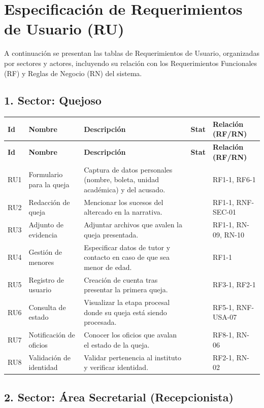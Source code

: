 \documentclass{article}
\begin{document}
\section*{Especificación de Requerimientos de Usuario (RU)}

A continuación se presentan las tablas de Requerimientos de Usuario, organizadas por sectores y actores, incluyendo su relación con los Requerimientos Funcionales (RF) y Reglas de Negocio (RN) del sistema.

\subsection*{1. Sector: Quejoso}

\begin{longtable}{|l|p{3cm}|p{6cm}|c|p{2.5cm}|}
\hline
\textbf{Id} & \textbf{Nombre} & \textbf{Descripción} & \textbf{Stat} & \textbf{Relación (RF/RN)} \\ \hline
\endfirsthead
\hline
\textbf{Id} & \textbf{Nombre} & \textbf{Descripción} & \textbf{Stat} & \textbf{Relación (RF/RN)} \\ \hline
\endhead
\hline
\endfoot
RU1 & Formulario para la queja & Captura de datos personales (nombre, boleta, unidad académica) y del acusado. & & RF1-1, RF6-1  \\ \hline
RU2 & Redacción de queja & Mencionar los sucesos del altercado en la narrativa. & & RF1-1, RNF-SEC-01  \\ \hline
RU3 & Adjunto de evidencia & Adjuntar archivos que avalen la queja presentada. & & RF1-1, RN-09, RN-10  \\ \hline
RU4 & Gestión de menores & Especificar datos de tutor y contacto en caso de que sea menor de edad. & & RF1-1  \\ \hline
RU5 & Registro de usuario & Creación de cuenta tras presentar la primera queja. & & RF3-1, RF2-1  \\ \hline
RU6 & Consulta de estado & Visualizar la etapa procesal donde su queja está siendo procesada. & & RF5-1, RNF-USA-07  \\ \hline
RU7 & Notificación de oficios & Conocer los oficios que avalan el estado de la queja. & & RF8-1, RN-06  \\ \hline
RU8 & Validación de identidad & Validar pertenencia al instituto y verificar identidad. & & RF2-1, RN-02  \\ \hline
\end{longtable}

\subsection*{2. Sector: Área Secretarial (Recepcionista)}
\end{document}
